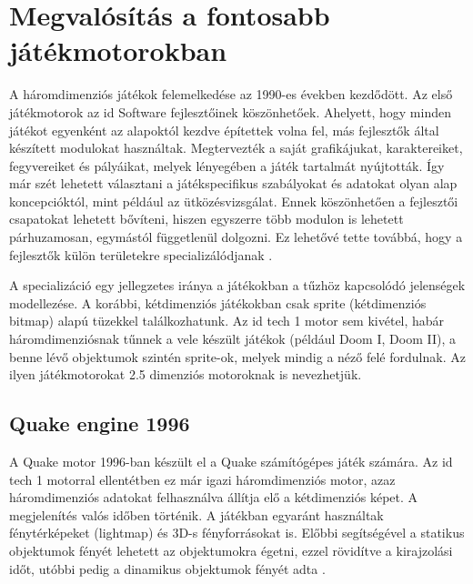 

\section{Megvalósítás a fontosabb játékmotorokban}

A háromdimenziós játékok felemelkedése az 1990-es években kezdődött. Az első játékmotorok az id Software fejlesztőinek köszönhetőek. Ahelyett, hogy minden játékot egyenként az alapoktól kezdve építettek volna fel, más fejlesztők által készített modulokat használtak. Megtervezték a saját grafikájukat, karaktereiket, fegyvereiket és pályáikat, melyek lényegében a játék tartalmát nyújtották. Így már szét lehetett választani a játékspecifikus szabályokat és adatokat olyan alap koncepcióktól, mint például az ütközésvizsgálat. Ennek köszönhetően a fejlesztői csapatokat lehetett bővíteni, hiszen egyszerre több modulon is lehetett párhuzamosan, egymástól függetlenül dolgozni. Ez lehetővé tette továbbá, hogy a fejlesztők külön területekre specializálódjanak \cite{wikiGameEngine}.

A specializáció egy jellegzetes iránya a játékokban a tűzhöz kapcsolódó jelenségek modellezése. A korábbi, kétdimenziós játékokban csak sprite (kétdimenziós bitmap) alapú tüzekkel találkozhatunk. Az id tech 1 motor sem kivétel, habár háromdimenziósnak tűnnek a vele készült játékok (például Doom I, Doom II), a benne lévő objektumok szintén sprite-ok, melyek mindig a néző felé fordulnak. Az ilyen játékmotorokat 2.5 dimenziós motoroknak is nevezhetjük. 


\subsection{Quake engine 1996}


A Quake motor 1996-ban készült el a Quake számítógépes játék számára. Az id tech 1 motorral ellentétben ez már igazi háromdimenziós motor, azaz háromdimenziós adatokat felhasználva állítja elő a kétdimenziós képet. A megjelenítés valós időben történik. A játékban egyaránt használtak fénytérképeket (lightmap) és 3D-s fényforrásokat is. Előbbi segítségével a statikus objektumok fényét lehetett az objektumokra égetni, ezzel rövidítve a kirajzolási időt, utóbbi pedig a dinamikus objektumok fényét adta \cite{wikiQuake}.

